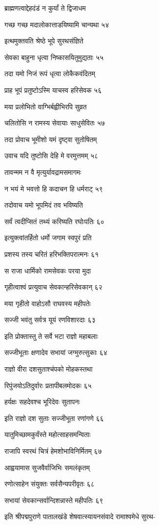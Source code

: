 ब्राह्मणत्वाद्देहदंडं न कुर्यां ते द्विजाधम

गच्छ गच्छ मदालोकात्ताडयिष्यामि चान्यथा ५४

इत्थमुक्तवति श्रेष्ठे भूपे सुरथसंज्ञिते

सेवका बाहुना धृत्वा निष्कासयितुमुद्यताः ५५

तदा यमो निजं रूपं धृत्वा लोकैकवंदितम्

प्राह भूपं प्रतुष्टोऽस्मि याचस्व हरिसेवक ५६

मया प्रलोभितो वाग्भिर्बह्वीभिरपि सुव्रत

चलितोसि न रामस्य सेवायाः साधुसेवितः ५७

तदा प्रोवाच भूमीशो यमं दृष्ट्वा सुतोषितम्

उवाच यदि तुष्टोसि देहि मे वरमुत्तमम् ५८

तावन्मम न वै मृत्युर्यावद्रामसमागमः

न भयं मे भवत्तो हि कदाचन हि धर्मराट् ५९

तदोवाच यमो भूपमिदं तव भविष्यति

सर्वं त्वदीप्सितं तथ्यं करिष्यति रघोःपतिः ६०

इत्युक्त्वांतर्हितो धर्मो जगाम स्वपुरं प्रति

प्रशस्य तस्य चरितं हरिभक्तिपरात्मनः ६१

स राजा धार्मिको रामसेवकः परया मुदा

गृहीत्वाश्वं प्रत्युवाच सेवकान्हरिसेवकान् ६२

मया गृहीतो वाहोऽसौ राघवस्य महीपतेः

सज्जी भवंतु सर्वत्र यूयं रणविशारदाः ६३

इति प्रोक्तास्तु ते सर्वे भटा राज्ञो महाबलाः

सज्जीभूताः क्षणादेव सभायां जग्मुरुत्सुकाः ६४

राज्ञो वीरा दशसुताश्चंपको मोहकस्तथा

रिपुंजयोऽतिदुर्वारः प्रतापीबलमोदकः ६५

हर्यक्षः सहदेवश्च भूरिदेवः सुतापनः

इति राज्ञो दश सुताः सज्जीभूता रणांगणे ६६

यातुमिच्छामकुर्वंस्ते महोत्साहसमन्विताः

राजापि स्वरथं चित्रं हेमशोभाविनिर्मितम् ६७

आह्वयामास सुजवैर्वाजिभिः समलंकृतम्

रणोत्साहेन संयुक्तः सर्वसैन्यपरीवृतः ६८

सभायां सेवकान्सर्वान्दिशन्नास्ते महीपतिः ६९

इति श्रीपद्मपुराणे पातालखंडे शेषवात्स्यायनसंवादे रामाश्वमेधे सुरथ-


